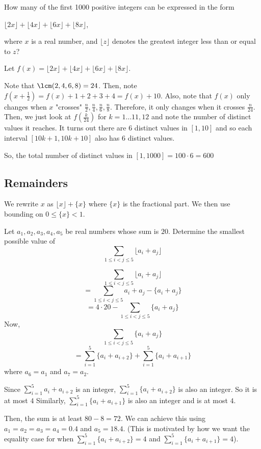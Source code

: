 \documentclass{article}
\begin{document}
\begin{exam}[1985 AIME/10]
How many of the first 1000 positive integers can be expressed in the form

$\lfloor 2x \rfloor + \lfloor 4x \rfloor + \lfloor 6x \rfloor + \lfloor 8x \rfloor$,

where $x$ is a real number, and $\lfloor z \rfloor$ denotes the greatest integer less than or equal to $z$?
\end{exam}

\begin{sol}
Let $f(x)=\lfloor 2x \rfloor + \lfloor 4x \rfloor + \lfloor 6x \rfloor + \lfloor 8x \rfloor$.

Note that $\lcm(2,4,6,8)=24$. Then, note $f(x+\frac{1}{2})=f(x)+1+2+3+4=f(x)+10$. Also, note that $f(x)$ only changes when $x$ "crosses" $\frac{n}{2}, \frac{n}{4}, \frac{n}{6}, \frac{n}{8}$. Therefore, it only changes when it crosses $\frac{n}{24}$. Then, we just look at $f(\frac{k}{24})$ for $k=1\ldots 11, 12$ and note the number of distinct values it reaches. It turns out there are $6$ distinct values in $[1,10]$ and so each interval $[10k+1,10k+10]$ also has $6$ distinct values.

So, the total number of distinct values in $[1,1000]=100\cdot 6=\boxed{600}$
\end{sol}

\subsection{Remainders}
We rewrite $x$ as $\lfloor x \rfloor + \{x\}$ where $\{x\}$ is the fractional part. We then use bounding on $0\leq \{x\}<1$.

\begin{exam}
Let $a_1,a_2,a_3,a_4,a_5$ be real numbers whose sum is $20$. Determine the smallest possible
value of
$$\sum_{1\leq i<j\leq 5} \lfloor a_{i}+a_{j}\rfloor$$
\end{exam}

\begin{sol}
$$\sum_{1\leq i<j\leq 5} \lfloor a_{i}+a_{j}\rfloor$$
$$ = \sum_{1\leq i<j\leq 5} a_{i}+a_{j} - \{a_{i}+a_{j}\}$$
$$ = 4\cdot 20 - \sum_{1\leq i < j\leq 5} \{a_{i}+a_{j}\}$$
Now, 
$$\sum_{1\leq i < j\leq 5} \{a_{i}+a_{j}\}$$
$$=\sum_{i=1}^{5} \{a_{i}+a_{i+2}\} + \sum_{i=1}^{5} \{a_{i}+a_{i+1}\}$$ where $a_{6}=a_{1}$ and $a_{7}=a_{2}$.

Since $\sum_{i=1}^{5} a_{i}+a_{i+2}$ is an integer, $\sum_{i=1}^{5} \{a_{i}+a_{i+2}\}$ is also an integer. So it is at most $4$ Similarly, $\sum_{i=1}^{5} \{a_{i}+a_{i+1}\}$ is also an integer and is at most $4$.

Then, the sum is at least $80-8=\boxed{72}$. We can achieve this using $a_{1}=a_{2}=a_{3}=a_{4}=0.4$ and $a_{5}=18.4$. (This is motivated by how we want the equality case for when $\sum_{i=1}^{5} \{a_{i}+a_{i+2}\}=4$ and $\sum_{i=1}^{5} \{a_{i}+a_{i+1}\}=4$).
\end{sol}
\end{document}
